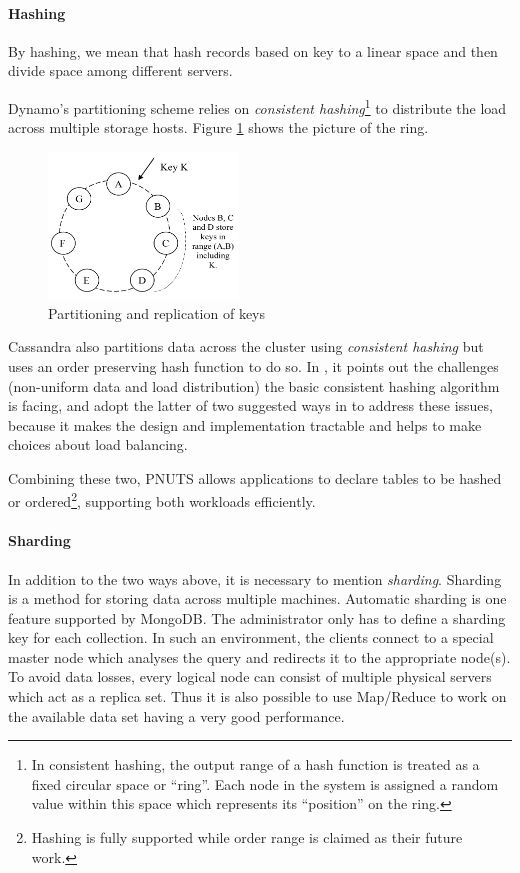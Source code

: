 \documentclass[letter,twocolumn]{article}
\begin{document}
\paragraph*{Hashing}
By hashing, we mean that hash records based on key to a linear space and then divide space among different servers.

Dynamo's partitioning scheme relies on \textit{consistent hashing}\footnote{In consistent hashing, the output range of a hash function is treated as a fixed circular space or ``ring''. Each node in the system is assigned a random value within this space which represents its ``position'' on the ring.} to distribute the load across multiple storage hosts. Figure \ref{fig:hashing} shows the picture of the ring.

\begin{figure}[htbp]
\centering
\includegraphics[width=0.45\textwidth]{fig/hashing}
\caption{Partitioning and replication of keys}
\label{fig:hashing}
\end{figure}


Cassandra also partitions data across the cluster using \textit{consistent hashing} but uses an order preserving hash function to do so. In \citep{LakshamAvinash2010}, it points out the challenges (non-uniform data and load distribution) the basic consistent hashing\citep{Karger1997} algorithm is facing, and adopt the latter of two suggested ways in \citep{Stoica2003} to address these issues, because it makes the design and implementation tractable and helps to make choices about load balancing.

Combining these two, PNUTS allows applications to declare tables to be hashed or ordered\footnote{Hashing is fully supported while order range is claimed as their future work.}, supporting both workloads efficiently.

\paragraph*{Sharding}
In addition to the two ways above, it is necessary to mention \textit{sharding}. Sharding is a method for storing data across multiple machines. Automatic sharding is one feature supported by MongoDB. The administrator only has to define a sharding key for each collection. In such an environment, the clients connect to a special master node which analyses the query and redirects it to the appropriate node(s). To avoid data losses, every logical node can consist of multiple physical servers which act as a replica set. Thus it is also possible to use Map/Reduce to work on the available data set having a very good performance.
\end{document}
